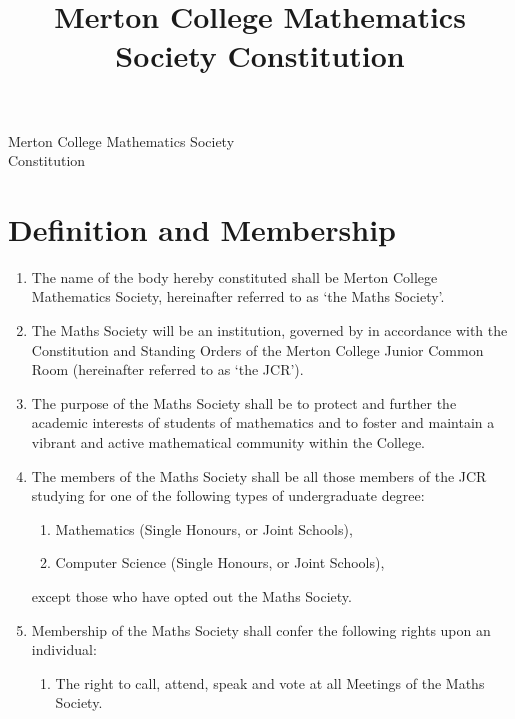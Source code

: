 \documentclass[pdftex,a4paper]{report}
\title{Merton College Mathematics Society Constitution}
\begin{document}
\begin{center}

	{\large Merton College Mathematics Society} \\[5pt]
	{\Huge Constitution}

\end{center}


\section*{Definition and Membership}

\begin{enumerate}[label=\Roman*)]
	\item The name of the body hereby constituted shall be Merton College Mathematics Society, hereinafter referred to as `the Maths Society'.
	\item The Maths Society will be an institution, governed by in accordance with the Constitution and Standing Orders of the Merton College Junior Common Room (hereinafter referred to as `the JCR').
	\item The purpose of the Maths Society shall be to protect and further the academic interests of students of mathematics and to foster and maintain a vibrant and active mathematical community within the College.
	\item The members of the Maths Society shall be all those members of the JCR studying for one of the following types of undergraduate degree:
	\begin{enumerate}[label=\roman*)]
		\item Mathematics (Single Honours, or Joint Schools),
		\item Computer Science (Single Honours, or Joint Schools),
	\end{enumerate}
	except those who have opted out the Maths Society.
	\item Membership of the Maths Society shall confer the following rights upon an individual:
	\begin{enumerate}[label=\roman*)]
		\item The right to call, attend, speak and vote at all Meetings of the Maths Society.

\end{enumerate}
\end{enumerate}
\end{document}
